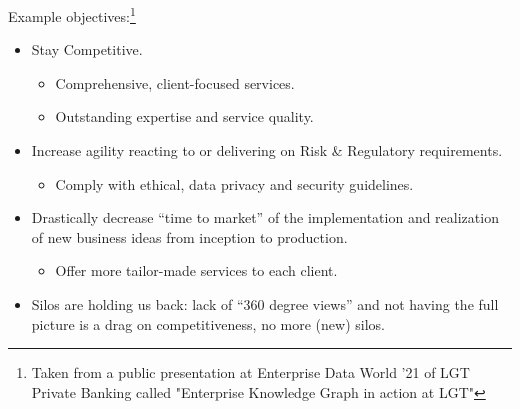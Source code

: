 %
%

Example objectives:\footnote{Taken from a public presentation at Enterprise Data World '21 of LGT Private Banking
called "Enterprise Knowledge Graph in action at LGT"}

\begin{itemize}
    \item Stay Competitive.
          \begin{itemize}
              \item Comprehensive, client-focused services.
              \item Outstanding expertise and service quality.
          \end{itemize}
    \item Increase agility reacting to or delivering on Risk \& Regulatory requirements.
          \begin{itemize}
              \item Comply with ethical, data privacy and security guidelines.
          \end{itemize}
    \item Drastically decrease \enquote{time to market} of the implementation and realization of new business ideas from
          inception to production.
          \begin{itemize}
              \item Offer more tailor-made services to each client.
          \end{itemize}
    \item Silos are holding us back: lack of \enquote{360 degree views} and not having the full picture is a
          drag on competitiveness, no more (new) silos.
\end{itemize}


